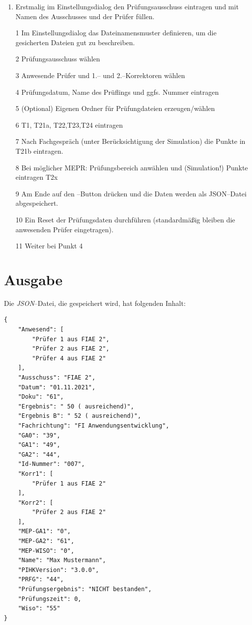 \documentclass[a4paper,notitlepage,parskip=half]{scrartcl}
\newcommand{\cfile}[1]{{\texttt{#1}}}
\begin{document}
\begin{enumerate}
\item Erstmalig im Einstellungsdialog den Prüfungsausschuss eintragen und mit Namen des Ausschusses und der Prüfer füllen.
\item[1] Im Einstellungsdialog das Dateinamensmuster definieren, um die gesicherten Dateien gut zu beschreiben.
\item[2] Prüfungsausschuss wählen
\item[3] Anwesende Prüfer und 1.-- und 2.--Korrektoren wählen
\item[4] Prüfungsdatum, Name des Prüflings und ggfs. Nummer eintragen
\item[5] (Optional) Eigenen Ordner für Prüfungdateien erzeugen/wählen
\item[6] T1, T21a, T22,T23,T24 eintragen
\item[7] Nach Fachgespräch (unter Berücksichtigung der Simulation) die Punkte in T21b eintragen.
\item[8] Bei möglicher MEPR: Prüfungsbereich anwählen und (Simulation!) Punkte eintragen T2x
\item[9] Am Ende auf den --Button drücken und die Daten werden als JSON--Datei abgespeichert.
\item[10] Ein Reset der Prüfungsdaten durchführen (standardmäßig bleiben die anwesenden Prüfer eingetragen).
\item[11] Weiter bei Punkt 4
\end{enumerate}

\section{Ausgabe}
Die \emph{JSON}--Datei, die gespeichert wird, hat folgenden Inhalt:
\nopagebreak[4]

\begin{minipage}[t]{\textwidth}
\begin{lstlisting}[numbers=none,caption={\cfile{Gesicherte Datei: $20160621Max\_Mustermann13145678.txt$}},label=lst:datei]
{
    "Anwesend": [
        "Prüfer 1 aus FIAE 2",
        "Prüfer 2 aus FIAE 2",
        "Prüfer 4 aus FIAE 2"
    ],
    "Ausschuss": "FIAE 2",
    "Datum": "01.11.2021",
    "Doku": "61",
    "Ergebnis": " 50 ( ausreichend)",
    "Ergebnis B": " 52 ( ausreichend)",
    "Fachrichtung": "FI Anwendungsentwicklung",
    "GA0": "39",
    "GA1": "49",
    "GA2": "44",
    "Id-Nummer": "007",
    "Korr1": [
        "Prüfer 1 aus FIAE 2"
    ],
    "Korr2": [
        "Prüfer 2 aus FIAE 2"
    ],
    "MEP-GA1": "0",
    "MEP-GA2": "61",
    "MEP-WISO": "0",
    "Name": "Max Mustermann",
    "PIHKVersion": "3.0.0",
    "PRFG": "44",
    "Prüfungsergebnis": "NICHT bestanden",
    "Prüfungszeit": 0,
    "Wiso": "55"
}


\end{lstlisting}
\end{minipage}
\end{document}
